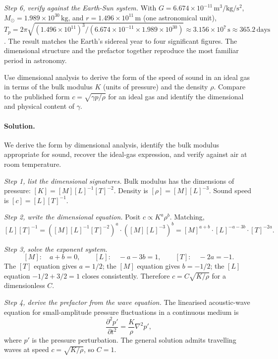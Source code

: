 \begin{exercise}
\textit{Step 6, verify against the Earth-Sun system.} With
$G = 6.674 \times 10^{-11} \,\si{\meter\cubed\per\kilogram\per\second
\squared}$, $M_{\odot} = 1.989 \times 10^{30} \,\si{\kilogram}$, and
$r = 1.496 \times 10^{11} \,\si{\meter}$ (one astronomical unit),
$T_{p} = 2\pi \sqrt{(1.496 \times 10^{11})^{3} / (6.674 \times 10^{-11}
\times 1.989 \times 10^{30})} \approx 3.156 \times 10^{7}\,\si{
\second} \approx 365.2 \,\text{days}$.
The result matches the Earth's sidereal year to four significant
figures. The dimensional structure and the prefactor together
reproduce the most familiar period in astronomy.
\end{exercise}

\begin{exercise}
Use dimensional analysis to derive the form of the speed of sound in
an ideal gas in terms of the bulk modulus $K$ (units of pressure)
and the density $\rho$. Compare to the published form $c = \sqrt
{\gamma p / \rho}$ for an ideal gas and identify the dimensional and
physical content of $\gamma$.

\paragraph{Solution.}
We derive the form by dimensional analysis, identify the bulk modulus
appropriate for sound, recover the ideal-gas expression, and verify
against air at room temperature.

\textit{Step 1, list the dimensional signatures.} Bulk modulus has
the dimensions of pressure: $[K] = [M][L]^{-1}[T]^{-2}$. Density is
$[\rho] = [M][L]^{-3}$. Sound speed is $[c] = [L][T]^{-1}$.

\textit{Step 2, write the dimensional equation.} Posit $c \propto
K^{a} \rho^{b}$. Matching,
\[
[L][T]^{-1}
= ([M][L]^{-1}[T]^{-2})^{a} \cdot ([M][L]^{-3})^{b}
= [M]^{a+b} \cdot [L]^{-a-3b} \cdot [T]^{-2a}.
\]

\textit{Step 3, solve the exponent system.}
\[
[M]: \quad a + b = 0, \qquad
[L]: \quad -a - 3b = 1, \qquad
[T]: \quad -2a = -1.
\]
The $[T]$ equation gives $a = 1/2$; the $[M]$ equation gives
$b = -1/2$; the $[L]$ equation $-1/2 + 3/2 = 1$ closes consistently.
Therefore $c = C \sqrt{K/\rho}$ for a dimensionless $C$.

\textit{Step 4, derive the prefactor from the wave equation.} The
linearised acoustic-wave equation for small-amplitude pressure
fluctuations in a continuous medium is
\[
\frac{\partial^{2} p'}{\partial t^{2}} = \frac{K}{\rho} \nabla^{2} p',
\]
where $p'$ is the pressure perturbation. The general solution
admits travelling waves at speed $c = \sqrt{K/\rho}$, so $C = 1$.


\end{exercise}
